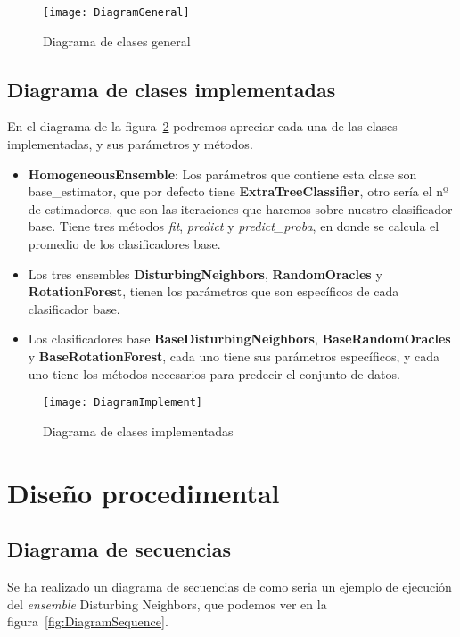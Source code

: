 \begin{figure}
\centering
\texttt{[image: DiagramGeneral]}
\caption{Diagrama de clases general}
\label{fig:DiagramGeneral}
\end{figure}

\subsection{Diagrama de clases implementadas}\label{diagram-implement}
En el diagrama de la figura~\ref{fig:DiagramImplement} podremos apreciar cada una de las clases implementadas, y sus parámetros y métodos.
\begin{itemize}	
	\item \textbf{HomogeneousEnsemble}: Los parámetros que contiene esta clase son base\_estimator, que por defecto tiene \textbf{ExtraTreeClassifier}, otro sería el nº de estimadores, que son las iteraciones que haremos sobre nuestro clasificador base. Tiene tres métodos \textit{fit}, \textit{predict} y  \textit{predict\_proba}, en donde se calcula el promedio de los clasificadores base.
	\item Los tres ensembles \textbf{DisturbingNeighbors}, \textbf{RandomOracles} y \textbf{RotationForest}, tienen los parámetros que son específicos de cada clasificador base.
	\item Los clasificadores base \textbf{BaseDisturbingNeighbors}, \textbf{BaseRandomOracles} y \textbf{BaseRotationForest}, cada uno tiene sus parámetros específicos, y cada uno tiene los métodos necesarios para predecir el conjunto de datos.
\end{itemize}

\begin{figure}
\centering
\texttt{[image: DiagramImplement]}
\caption{Diagrama de clases implementadas}
\label{fig:DiagramImplement}
\end{figure}

\section{Diseño procedimental}
\subsection{Diagrama de secuencias}\label{diagrama-secuencias}
Se ha realizado un diagrama de secuencias de como seria un ejemplo de ejecución del \textit{ensemble} Disturbing Neighbors, que podemos ver en la figura~\ref{fig:DiagramSequence}.

